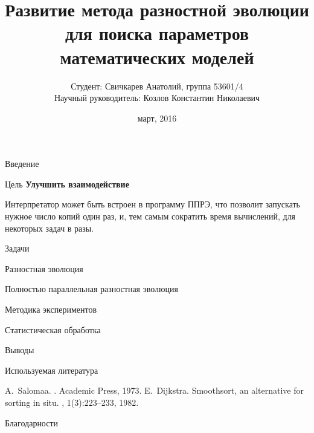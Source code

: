 \documentclass{beamer}
\begin{document}
\title[Развитие ППРЭ]
{Развитие метода разностной эволюции
для поиска параметров математических моделей}
\author[Свичкарев Анатолий]
{Студент: Свичкарев Анатолий, группа 53601/4\\
Научный руководитель: Козлов Константин Николаевич}
\date{март, 2016}

\frame{\titlepage} 

\begin{frame}{Введение}
\end{frame}

\begin{frame}{Цель}
\textbf{Улучшить взаимодействие}

\bigskip
Интерпретатор может
быть встроен в программу ППРЭ,
что позволит запускать
нужное число копий один раз,
и, тем самым сократить время вычислений,
для некоторых задач в разы.
\end{frame}

\begin{frame}{Задачи}
\end{frame}

\begin{frame}{Разностная эволюция}
\end{frame}

\begin{frame}{Полностью параллельная разностная эволюция}
\end{frame}

\begin{frame}{Методика экспериментов}
\end{frame}

\begin{frame}{Статистическая обработка}
\end{frame}

\begin{frame}{Выводы}
\end{frame}

\begin{frame}{Используемая литература}
\begin{thebibliography}{Dijkstra, 1982}
        A.~Salomaa.
        .
        \newblock Academic Press, 1973.
        E.~Dijkstra.
        \newblock Smoothsort, an alternative for sorting in situ.
        , 1(3):223--233, 1982.
\end{thebibliography}
\end{frame}

\begin{frame}{Благодарности}
\end{frame}
\end{document}
